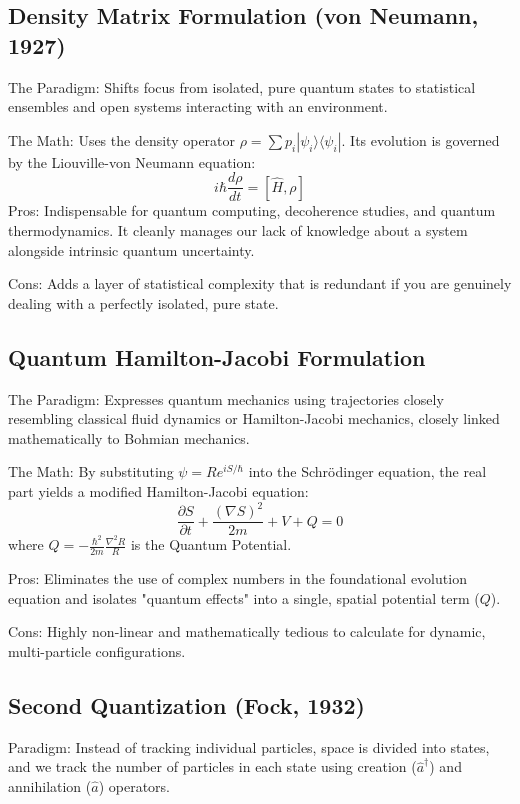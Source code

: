 \subsection{Density Matrix Formulation (von Neumann, 1927)}

The Paradigm: Shifts focus from isolated, pure quantum states to 
statistical ensembles and open systems interacting with an environment.

The Math: Uses the density operator $\rho = \sum p_i |\psi_i\rangle\langle\psi_i|$. 
Its evolution is governed by the Liouville-von Neumann equation:
$$i\hbar \frac{d\rho}{dt} = [\hat{H}, \rho]$$
Pros: Indispensable for quantum computing, decoherence studies, 
and quantum thermodynamics. It cleanly manages our lack of knowledge 
about a system alongside intrinsic quantum uncertainty.

Cons: Adds a layer of statistical complexity that is redundant if you are 
genuinely dealing with a perfectly isolated, pure state.

\subsection{Quantum Hamilton-Jacobi Formulation}
The Paradigm: Expresses quantum mechanics using trajectories closely 
resembling classical fluid dynamics or Hamilton-Jacobi mechanics, closely 
linked mathematically to Bohmian mechanics.

The Math: By substituting $\psi = R e^{iS/\hbar}$ into the Schrödinger 
equation, the real part yields a modified Hamilton-Jacobi equation:
$$\frac{\partial S}{\partial t} + \frac{(\nabla S)^2}{2m} + V + Q = 0$$
where $Q = -\frac{\hbar^2}{2m}\frac{\nabla^2 R}{R}$ is the Quantum Potential.

Pros: Eliminates the use of complex numbers in the foundational evolution 
equation and isolates "quantum effects" into a single, spatial potential
term ($Q$).

Cons: Highly non-linear and mathematically tedious to calculate for dynamic,
multi-particle configurations.

\subsection{ Second Quantization (Fock, 1932)}
Paradigm: Instead of tracking individual particles, space is divided into 
states, and we track the number of particles in each state using creation
($\hat{a}^\dagger$) and annihilation ($\hat{a}$) operators.

